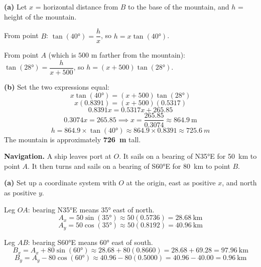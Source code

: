 \documentclass[addpoints]{exam}
\begin{document}
\begin{questions}
\begin{solution}
\textbf{(a)} Let $x$ = horizontal distance from $B$ to the base of the mountain, and $h$ = height of the mountain.

From point $B$: $\tan(\ang{40}) = \dfrac{h}{x}$, so $h = x\tan(\ang{40})$.

From point $A$ (which is $500$ m farther from the mountain): $\tan(\ang{28}) = \dfrac{h}{x + 500}$, so $h = (x+500)\tan(\ang{28})$.

\textbf{(b)} Set the two expressions equal:
\[
x\tan(\ang{40}) = (x+500)\tan(\ang{28})
\]
\[
x(0.8391) = (x+500)(0.5317)
\]
\[
0.8391x = 0.5317x + 265.85
\]
\[
0.3074x = 265.85 \implies x = \frac{265.85}{0.3074} \approx 864.9\ \text{m}
\]
\[
h = 864.9 \times \tan(\ang{40}) \approx 864.9 \times 0.8391 \approx \SI{725.6}{m}
\]
The mountain is approximately \textbf{\SI{726}{m}} tall.
\end{solution}

\vspace{5mm}

\question[6]
\textbf{Navigation.}
A ship leaves port at $O$. It sails on a bearing of N\ang{35}E for \SI{50}{km} to point $A$. It then turns and sails on a bearing of S\ang{60}E for \SI{80}{km} to point $B$.


\begin{solution}
\textbf{(a)} Set up a coordinate system with $O$ at the origin, east as positive $x$, and north as positive $y$.

Leg $OA$: bearing N\ang{35}E means \ang{35} east of north.
\[
A_x = 50\sin(\ang{35}) \approx 50(0.5736) = 28.68\ \text{km}
\]
\[
A_y = 50\cos(\ang{35}) \approx 50(0.8192) = 40.96\ \text{km}
\]

Leg $AB$: bearing S\ang{60}E means \ang{60} east of south.
\[
B_x = A_x + 80\sin(\ang{60}) \approx 28.68 + 80(0.8660) = 28.68 + 69.28 = 97.96\ \text{km}
\]
\[
B_y = A_y - 80\cos(\ang{60}) \approx 40.96 - 80(0.5000) = 40.96 - 40.00 = 0.96\ \text{km}
\]


\end{solution}
\end{questions}
\end{document}
